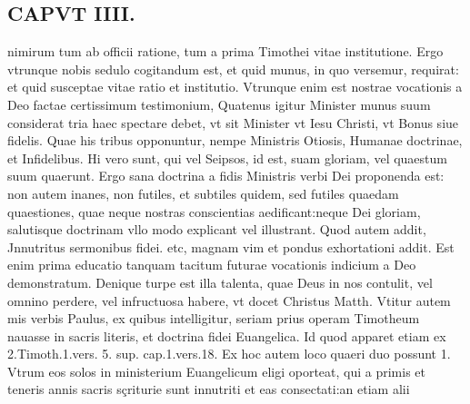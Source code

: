 \documentclass{article}
\begin{document}
\begin{pages}
\section*{CAPVT  IIII. }
\marginpar{[ p.201 ]}\pstart nimirum tum ab officii ratione, tum a prima Timothei vitae institutione. Ergo vtrunque nobis sedulo cogitandum est, et quid munus, in quo versemur, requirat: et quid susceptae vitae ratio et institutio. Vtrunque enim est nostrae vocationis a Deo factae certissimum testimonium, Quatenus igitur Minister munus suum considerat tria haec spectare debet, vt sit Minister vt Iesu Christi, vt Bonus siue fidelis. Quae his tribus opponuntur, nempe Ministris Otiosis, Humanae doctrinae, et Infidelibus. Hi vero sunt, qui vel Seipsos, id est, suam gloriam, vel quaestum suum quaerunt. Ergo sana doctrina a fidis Ministris verbi Dei proponenda est: non autem inanes, non futiles, et subtiles quidem, sed futiles quaedam quaestiones, quae neque nostras conscientias aedificant:neque Dei gloriam, salutisque doctrinam vllo modo explicant vel illustrant. Quod autem addit, Jnnutritus sermonibus fidei. etc, magnam vim et pondus exhortationi addit. Est enim prima educatio tanquam tacitum futurae vocationis indicium a Deo demonstratum. Denique turpe est illa talenta, quae Deus in nos contulit, vel omnino perdere, vel infructuosa habere, vt docet Christus Matth. Vtitur autem mis verbis Paulus, ex quibus intelligitur, seriam prius operam Timotheum nauasse in sacris literis, et doctrina fidei Euangelica. Id quod apparet etiam ex 2.Timoth.1.vers. 5. sup. cap.1.vers.18. Ex hoc autem loco quaeri duo possunt 1. Vtrum eos solos in ministerium Euangelicum eligi oporteat, qui a primis et teneris annis sacris sçriturie sunt innutriti et eas consectati:an etiam alii  \pend

\end{pages}
\end{document}
